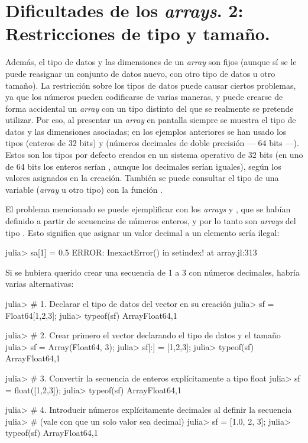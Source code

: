 \section{Dificultades de los \emph{arrays}. 2: Restricciones de tipo y tamaño.}

Además, el tipo de datos y las dimensiones de un \emph{array} son fijos (aunque sí se le puede reasignar un conjunto de datos nuevo, con otro tipo de datos u otro tamaño). La restricción sobre los tipos de datos puede causar ciertos problemas, ya que los números pueden codificarse de varias maneras, y puede crearse de forma accidental un \emph{array} con un tipo distinto del que se realmente se pretende utilizar. Por eso, al presentar un \emph{array} en pantalla siempre se muestra el tipo de datos y las dimensiones asociadas; en los ejemplos anteriores se han usado los tipos  (enteros de 32 bits) y  (números decimales de doble precisión --- 64 bits ---). Estos son los tipos por defecto creados en un sistema operativo de 32 bits (en uno de 64 bits los enteros serían , aunque los decimales serían iguales), según los valores asignados en la creación. También se puede consultar el tipo de una variable (\emph{array} u otro tipo) con la función .

El problema mencionado se puede ejemplificar con los \emph{arrays}  y , que se habían definido a partir de secuencias de números enteros, y por lo tanto son \emph{arrays} del tipo . Esto significa que asignar un valor decimal a un elemento sería ilegal:

\begin{jlconcode}
julia> sa[1] = 0.5
ERROR: InexactError()
 in setindex! at array.jl:313
\end{jlconcode}

Si se hubiera querido crear una secuencia de 1 a 3 con números decimales, habría varias alternativas:

\begin{jlconcode}
julia> # 1. Declarar el tipo de datos del vector en su creación
julia> sf = Float64[1,2,3];
julia> typeof(sf)
Array{Float64,1}

julia> # 2. Crear primero el vector declarando el tipo de datos y el tamaño
julia> sf = Array(Float64, 3);
julia> sf[:] = [1,2,3];
julia> typeof(sf)
Array{Float64,1}

julia> # 3. Convertir la secuencia de enteros explícitamente a tipo float
julia> sf = float([1,2,3]);
julia> typeof(sf)
Array{Float64,1}

julia> # 4. Introducir números explícitamente decimales al definir la secuencia
julia> # (vale con que un solo valor sea decimal)
julia> sf = [1.0, 2, 3];
julia> typeof(sf)
Array{Float64,1}
\end{jlconcode}

